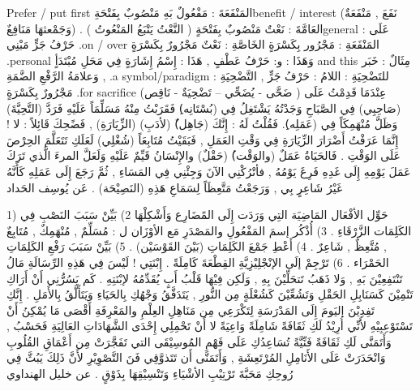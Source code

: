 \documentclass[a4paper]{article}
\begin{document}
\begin{flushright}
‏Prefer / put first
المَنْفَعَةَ : مَفْعُولٌ بَهِ مَنْصُوبٌ بِفَتْحَةِbenefit / interest
            (نَفَعَ , مَنْفَعَةٌ وَجَمْعثهَا مَنَافِعٌ) .
العَامَّةَ : نَعْتٌ مَنْصُوبٌ بِفَتْحَةٍ ( النَّعْتُ يَتْبَعُ المَنْعُوتُ )general
عَلَى : حَرْفُ جَرٍّ مَبْنِي .on / over
المَنْفَعَةِ : مَجْرُور بِكَسْرَةٍ
الخَاصَّةِ : نَعْتٌ مَجْرُورٌ بِكَسْرَةٍ .personal
وَهَذَا : و: حَرْفُ عَطْفٍ , هَذَا : إِسْمُ إِشَارَةٍ فِي مَحَلِ مُبْتَدَأٍ and this
مِثَالٌ : خَبَر , وَعلامَةُ الرَّفْعِ الضَّمَةِ .a symbol/paradigm
للتَضْحِيَةِ : اللامُ : حَرْفُ جَرٍّ , التَّضْحِيَةِ : مَجْرُورٌ بِكَسْرَةٍ .for sacrifice
(ضَحَّى - يُضَحِّي – تَضْحِيَةٌ - نَاقِص )
عِنْدَمَا قَدِمْتُ عَلَى (صَاحِبِي) فِي الصَّبَاحِ وَجَدْتُهُ يَشْتَغِلُ فِي
(بُسْتَانِه)ِ فَقَرَبْتُ مِنْهُ مَسَلِّمَاً عَلَيْهِ فَرَدَّ (التَّحِيَّةَ) وَظَلَّ مُنْهَمِكَاً فِي
(عَمَلِه)ِ. فَقُلْتُ لَهُ : إِنَّكَ (جَاهِل)ٌ (لأدَبِ) (الزِّيَارَةِ) , فَضًحِكَ
قَائِلاً : لا ! إِنَّمَا عَرَفْتُ أَضْرَارَ الزِّيَارَةِ فِي وَقْتِ العَمَلِ ,
فَبَقَيْتُ مُتَابِعَاً (شُغْلِي) لَعَلَكِ تَتَعَلَّمَ الحِرْصَ عَلَى الوَقْتِ . فَالحَيَاةُ
عَمَلٌ (والوَقْت)ُ (حَقْلٌ) والإِنْسَانُ قَيِّمٌ عَلَيْهِ وَلَعَلَّ المرءَ الَّذي
تَرَكَ عَمَلَ يَوْمِهِ إِلَى غَدِهِ فَرِغَ يَوْمُهُ , فأتْرُكْنِي الآنَ وَجِئْنِي فِي
المَسَاءِ , ثُمَّ رَجَعَ إِلَى عَمَلِهِ كَأَنَّهُ غَيْرُ شَاعِرٍ بِي , وَرَجَعْتُ
مَتَّعِظَاً لِسَمَاعِ هَذِهِ (النَصِيْحَة) .
                                عَن يُوسِف الحَداد
 

1) حَوِّل الأفْعَال المَاضِيَة التِي وَرَدَت إِلَى المًضَارِع وَأَشْكِلْهَا
2)          بَيِّنْ سَبَبَ النَصْبِ فِي الكَلِمَات الزَّرْقَاءِ .
3)     أُذْكُر إسمَ المَفْعُولِ والمَصْدَرِ مَع الأوْزَان ل :
مُسَلِّمٌ , مُنْهَمِكٌ , مُتَابِعٌ , مُتَّعِظٌ , شَاعِرٌ .
4)          أَعْطِ جَمْعَ الكَلِمَاتِ (بَيْنَ القَوْسَيْن) .
5)          بَيِّنْ سَبَبَ رَفْعِ الكَلِمَاتِ الحَمْرَاء .
6)          تَرْجِمْ إلَى الإنْجْلِيْزِيَّةِ القِطْعَةَ كَامِلَةً .
إِبْنَتِي ! لَيْسَ فِي هَذِهِ الرِّسَالَةِ مَالُ تَنْتَفِعِيْنَ بَهِ , وَلا ذَهَبُ
تَتحَلِّيْنَ بِهِ , وَلَكِن فِيْهَا قَلْبُ أَبٍ يُقَدِّمُهُ لإبْنَتِهِ .
كَم يَسُرُّنِي أَنْ أَرَاكِ تَنْمِيْنَ كَسَنَابِلِ الحَقْلِ وَتَشُعِّيْنَ كَشُعْلَةٍ
مِن النُّورِ , يَتَدَفَّقُ وَجْهُكِ بِالحَيَاءِ وَيَتَأَلَّقُ بِالأَمَلِ . إِنَّكِ تَفِدِيْنَ
اليَومَ إِلَى المَدْرَسَةِ لِتَكْرَعِي مِن مَنَاهِلِ العِلْمِ والمَعْرِفَةِ أَقْصَى
مَا يُمْكِنُ أَنْ تَسْتَوْعِبِيْهِ لأَنِّي أُرِيْدُ لَكِ ثَقَافَةً شَامِلَةً وَاعِيَةً لا
أَنْ تَحْمِلِي إِحْدَى الشَّهَادَاتِ العَالِيَةِ فَحَسْبُ , وَأَتَمَنَّى لَكِ ثَقَافَةً
فَنِّيَّةً تُسَاعِدُكِ عَلَى فَهْمِ المُوسِيْقَى التي تَفَجَّرَتْ مِن أَعْمَاقِ
القُلُوبِ وَانْحَدَرَتْ عَلَى الأَنَامِلِ المُرْتَعِشَةِ , وَأَتَمَنَّى أَن تَتَذوَّقِي
فَنَ التَّصْوِيْرِ لأَنَّ ذَلِكَ يَبُثَّ فِي رُوحِكِ مَحَبَّةَ تَرْتِيْبِ الأشْيَاءِ
وَتَنْسِيْقِهَا بِذَوْقٍ .
                                عن خليل الهنداوي
 


\end{flushright}
\end{document}
